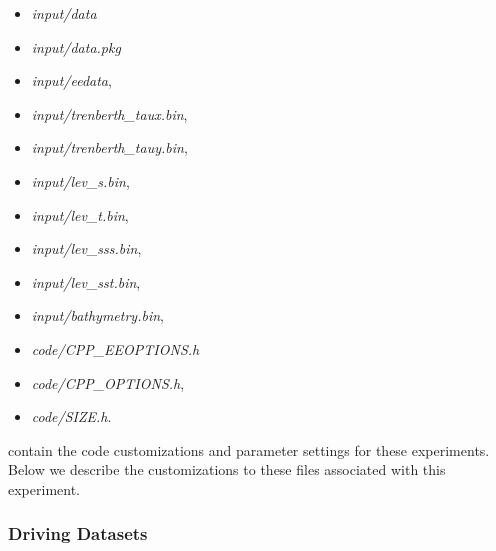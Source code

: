 \begin{itemize}
\item {\it input/data}
\item {\it input/data.pkg}
\item {\it input/eedata},
\item {\it input/trenberth\_taux.bin},
\item {\it input/trenberth\_tauy.bin},
\item {\it input/lev\_s.bin},
\item {\it input/lev\_t.bin},
\item {\it input/lev\_sss.bin},
\item {\it input/lev\_sst.bin},
\item {\it input/bathymetry.bin},
\item {\it code/CPP\_EEOPTIONS.h}
\item {\it code/CPP\_OPTIONS.h},
\item {\it code/SIZE.h}. 
\end{itemize}
contain the code customizations and parameter settings for these
experiments. Below we describe the customizations
to these files associated with this experiment.

\subsubsection{Driving Datasets}





